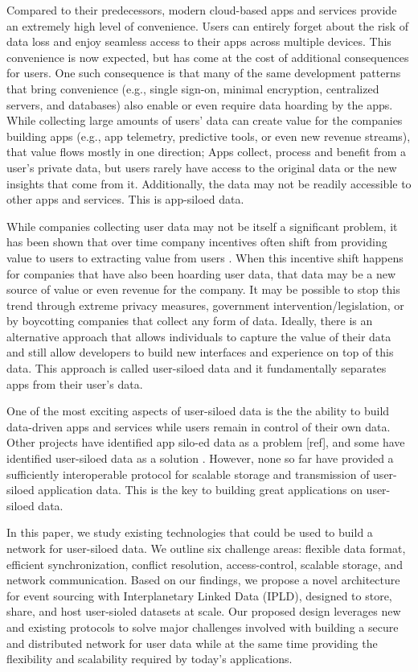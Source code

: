 \documentclass{textile}
\begin{document}
Compared to their predecessors, modern cloud-based apps and services provide an extremely high level of convenience. Users can entirely forget about the risk of data loss and enjoy seamless access to their apps across multiple devices. This convenience is now expected, but has come at the cost of additional consequences for users. One such consequence is that many of the same development patterns that bring convenience (e.g., single sign-on, minimal encryption, centralized servers, and databases) also enable or even require data hoarding by the apps. While collecting large amounts of users' data can create value for the companies building apps (e.g., app telemetry, predictive tools, or even new revenue streams), that value flows mostly in one direction; Apps collect, process and benefit from a user's private data, but users rarely have access to the original data or the new insights that come from it. Additionally,  the data may not be readily accessible to other apps and services. This is app-siloed data.

While companies collecting user data may not be itself a significant problem, it has been shown that over time company incentives often shift from providing value to users to extracting value from users \cite{dixonWhyDecentralizationMatters2018}. When this incentive shift happens for companies that have also been hoarding user data, that data may be a new source of value or even revenue for the company. It may be possible to stop this trend through extreme privacy measures, government intervention/legislation, or by boycotting companies that collect any form of data. Ideally, there is an alternative approach that allows individuals to capture the value of their data and still allow developers to build new interfaces and experience on top of this data. This approach is called user-siloed data and it fundamentally separates apps from their user's data.

One of the most exciting aspects of user-siloed data is the the ability to build data-driven apps and services while users remain in control of their own data. Other projects have identified app silo-ed data as a problem [ref], and some have identified user-siloed data as a solution \cite{sambraSolidPlatformDecentralized2016}. However, none so far have provided a sufficiently interoperable protocol for scalable storage and transmission of user-siloed application data. This is the key to building great applications on user-siloed data.

In this paper, we study existing technologies that could be used to build a network for user-siloed data. We outline six challenge areas: flexible data format, efficient synchronization, conflict resolution, access-control, scalable storage, and network communication. Based on our findings, we propose a novel architecture for event sourcing with Interplanetary Linked Data (IPLD), designed to store, share, and host user-sioled datasets at scale. Our proposed design leverages new and existing protocols to solve major challenges involved with building a secure and distributed network for user data while at the same time providing the flexibility and scalability required by today's applications. 
\end{document}
